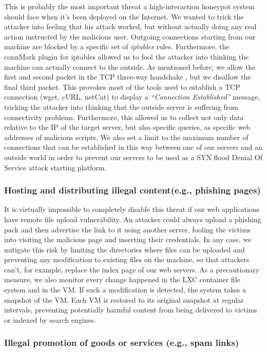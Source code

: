  This is probably the most important threat a high-interaction honeypot system should face when it's been deployed on the Internet. We wanted to trick the attacker into feeling that his attack worked, but without actually doing any real action instructed by the malicious user. Outgoing connections starting from our machine are blocked by a specific set of \emph{iptables} rules. Furthermore, the connMark plugin for iptables allowed us to fool the attacker into thinking the machine can actually connect to the outside. As mentioned before, we allow the first and second packet in the TCP three-way handshake , but we disallow the final third packet. This provokes most of the tools used to establish a TCP connection (wget, cURL, netCat) to display a \emph{``Connection Established''} message, tricking the attacker into thinking that the outside server is suffering from connectivity problems. Furthermore, this allowed us to collect not only data relative to the IP of the target server, but also specific queries, as specific web addresses of malicious scripts. We also set a limit to the maximum number of connections that can be established in this way between one of our servers and an outside world in order to prevent our servers to be used as a SYN flood Denial Of Service attack starting platform.

\subsubsection{Hosting and distributing illegal content(e.g., phishing pages)}

 It is virtually impossible to completely disable this threat if our web applications have remote file upload vulnerability. An attacker could always upload a phishing pack and then advertise the link to it using another server, fooling the victims into visiting the malicious page and inserting their credentials. In any case, we mitigate this risk by limiting the directories where files can be uploaded and preventing any modification to existing files on the machine, so that attackers can't, for example, replace the index page of our web servers. As a precautionary measure, we also monitor every change happened in the LXC container file system and in the VM. If such a modification is detected, the system takes a snapshot of the VM. Each VM is restored to its original snapshot at regular intervals, preventing potentially harmful content from being delivered to victims or indexed by search engines.

\subsubsection{Illegal promotion of goods or services (e.g., spam links)}

